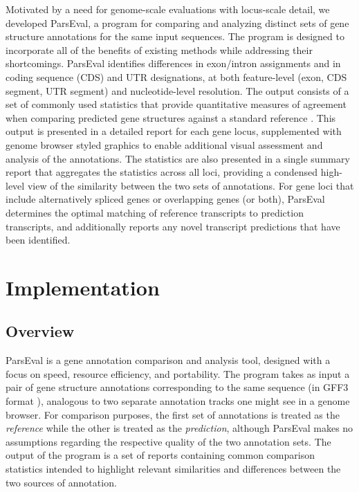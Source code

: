 Motivated by a need for genome-scale evaluations with locus-scale detail, we developed ParsEval, a program for comparing and analyzing distinct sets of gene structure annotations for the same input sequences.
The program is designed to incorporate all of the benefits of existing methods while addressing their shortcomings.
ParsEval identifies differences in exon/intron assignments and in coding sequence (CDS) and UTR designations, at both feature-level (exon, CDS segment, UTR segment) and nucleotide-level resolution.
The output consists of a set of commonly used statistics that provide quantitative measures of agreement when comparing predicted gene structures against a standard reference \citep{Burset,Zhao,AED}.
This output is presented in a detailed report for each gene locus, supplemented with genome browser styled graphics to enable additional visual assessment and analysis of the annotations.
The statistics are also presented in a single summary report that aggregates the statistics across all loci, providing a condensed high-level view of the similarity between the two sets of annotations.
For gene loci that include alternatively spliced genes or overlapping genes (or both), ParsEval determines the optimal matching of reference transcripts to prediction transcripts, and additionally reports any novel transcript predictions that have been identified.

\section{Implementation}

\subsection{Overview}
ParsEval is a gene annotation comparison and analysis tool, designed with a focus on speed, resource efficiency, and portability.
The program takes as input a pair of gene structure annotations corresponding to the same sequence (in GFF3 format \citep{GFF3}), analogous to two separate annotation tracks one might see in a genome browser.
For comparison purposes, the first set of annotations is treated as the \emph{reference} while the other is treated as the \emph{prediction}, although ParsEval makes no assumptions regarding the respective quality of the two annotation sets.
The output of the program is a set of reports containing common comparison statistics intended to highlight relevant similarities and differences between the two sources of annotation.


